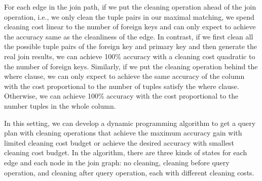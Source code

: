 For each edge in the join path, if we put the cleaning operation ahead of the join operation, i.e., we only clean the tuple pairs in our maximal matching, we spend cleaning cost linear to the number of foreign keys and can only expect to achieve the accuracy same as the cleanliness of the edge. In contrast, if we first clean all the possible tuple pairs of the foreign key and primary key and then generate the real join results, we can achieve 100\% accuracy with a cleaning cost quadratic to the number of foreign keys. Similarly, if we put the cleaning operation behind the where clause, we can only expect to achieve the same accuracy of the column with the cost proportional to the number of tuples satisfy the where clause. Otherwise, we can achieve 100\% accuracy with the cost proportional to the number tuples in the whole column.




In this setting, we can develop a dynamic programming algorithm to get a query plan with cleaning operations that achieve the maximum accuracy gain with limited cleaning cost budget or achieve the desired accuracy with smallest cleaning cost budget. In the algorithm, there are three kinds of states for each edge and each node in the join graph: 
no cleaning, cleaning before query operation, and cleaning after query operation, each with different cleaning costs.


